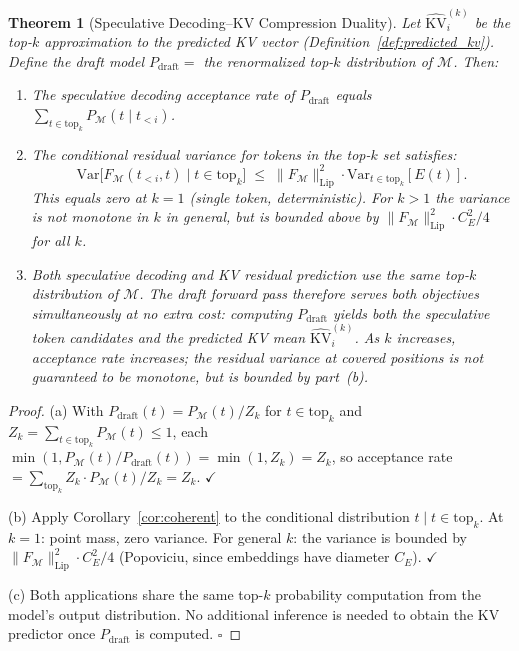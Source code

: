 \documentclass[11pt]{article}
\newtheorem{theorem}{Theorem}
\begin{document}
\begin{theorem}[Speculative Decoding--KV Compression Duality]
\label{thm:spec_decode_duality}
Let $\widehat{\mathrm{KV}}_i^{(k)}$ be the top-$k$ approximation to the predicted
KV vector (Definition~\ref{def:predicted_kv}).  Define the draft model
$P_{\mathrm{draft}} = $ the renormalized top-$k$ distribution of $\mathcal{M}$.
Then:
\begin{enumerate}[leftmargin=2em,label=(\alph*)]
  \item The speculative decoding acceptance rate of $P_{\mathrm{draft}}$ equals
        $\sum_{t \in \mathrm{top}_k} P_{\mathcal{M}}(t \mid t_{<i})$.
  \item The conditional residual variance for tokens in the top-$k$ set satisfies:
        \[
          \mathrm{Var}\bigl[F_{\mathcal{M}}(t_{<i},t) \mid t \in \mathrm{top}_k\bigr]
          \;\leq\; \|F_{\mathcal{M}}\|_{\mathrm{Lip}}^2 \cdot \mathrm{Var}_{t \in \mathrm{top}_k}[E(t)].
        \]
        This equals zero at $k=1$ (single token, deterministic).  For $k>1$
        the variance is not monotone in $k$ in general, but is bounded above
        by $\|F_{\mathcal{M}}\|_{\mathrm{Lip}}^2 \cdot C_E^2/4$ for all $k$.
  \item Both speculative decoding and KV residual prediction use the same
        top-$k$ distribution of $\mathcal{M}$.  The draft forward pass
        therefore serves both objectives simultaneously at no extra cost:
        computing $P_{\mathrm{draft}}$ yields both the speculative token
        candidates \emph{and} the predicted KV mean $\widehat{\mathrm{KV}}_i^{(k)}$.
        As $k$ increases, acceptance rate increases; the residual variance
        at covered positions is not guaranteed to be monotone, but is bounded
        by part~(b).
\end{enumerate}
\end{theorem}

\begin{proof}
(a) With $P_{\mathrm{draft}}(t) = P_{\mathcal{M}}(t)/Z_k$ for $t \in \mathrm{top}_k$
and $Z_k = \sum_{t \in \mathrm{top}_k} P_{\mathcal{M}}(t) \leq 1$,
each $\min(1, P_{\mathcal{M}}(t)/P_{\mathrm{draft}}(t)) = \min(1,Z_k) = Z_k$,
so acceptance rate $= \sum_{\mathrm{top}_k} Z_k \cdot P_{\mathcal{M}}(t)/Z_k = Z_k$. $\checkmark$

(b) Apply Corollary~\ref{cor:coherent} to the conditional distribution
$t \mid t \in \mathrm{top}_k$.  At $k=1$: point mass, zero variance.
For general $k$: the variance is bounded by $\|F_{\mathcal{M}}\|_{\mathrm{Lip}}^2
\cdot C_E^2/4$ (Popoviciu, since embeddings have diameter $C_E$). $\checkmark$

(c) Both applications share the same top-$k$ probability computation from
the model's output distribution.  No additional inference is needed to obtain
the KV predictor once $P_{\mathrm{draft}}$ is computed. $\square$
\end{proof}
\end{document}
